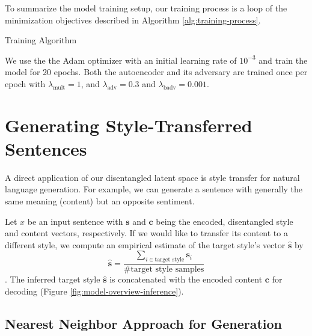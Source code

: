 To summarize the model training setup, our training process is a loop of the minimization objectives described in Algorithm \ref{alg:training-process}.

\begin{algorithm}[H]
	\caption{\label{alg:training-process} Training Algorithm}
\end{algorithm}

We use the the Adam optimizer \citep{kingma2014adam} with an initial learning rate of $10^{-3}$ and train the model for 20 epochs. Both the autoencoder and its adversary are trained once per epoch with $\lambda_\text{mult} = 1$, and $\lambda_\text{adv} = 0.3$ and $\lambda_\text{badv} = 0.001$.


\section{Generating Style-Transferred Sentences} \label{ssec:generating-novel-text}

A direct application of our disentangled latent space is style transfer for natural language generation. For example, we can generate a sentence with generally the same meaning (content) but an opposite sentiment.

Let $x$ be an input sentence with $\bm s$ and $\bm c$ being the encoded, disentangled style and content vectors, respectively. If we would like to transfer its content to a different style, we compute an empirical estimate of the target style's vector $\hat{\bm s}$ by
$$\hat{\bm s}=\frac{\sum_{i\in\text{target style}}\bm s_i}{\text{\# target style samples}}$$. The inferred target style $\hat{\bm s}$ is concatenated with the encoded content $\bm c$ for decoding (Figure \ref{fig:model-overview-inference}).


\subsection{Nearest Neighbor Approach for Generation}
